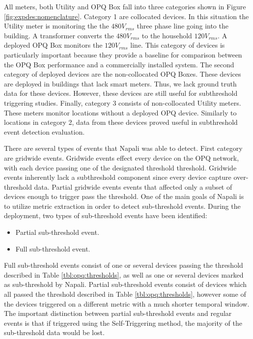 All meters, both Utility and OPQ Box fall into three categories shown in Figure \ref{fig:expdes:nomenclature}.
Category 1 are collocated devices.
In this situation the Utility meter is monitoring the the $480V_{rms}$ three phase line going into the building.
A transformer converts the $480V_{rms}$ to the household $120V_{rms}$.
A deployed OPQ Box monitors the $120V_{rms}$ line.
This category of devices is particularly important because they provide a baseline for comparison between the OPQ Box performance and a commercially installed system.
The second category of deployed devices are the non-collocated OPQ Boxes.
These devices are deployed in buildings that lack smart meters.
Thus, we lack ground truth data for these devices.
However, these devices are still useful for subthreshold triggering studies.
Finally, category 3 consists of non-collocated Utility meters.
These meters monitor locations without a deployed OPQ device.
Similarly to locations in category 2, data from these devices proved useful in subthreshold event detection evaluation.

There are several types of events that Napali was able to detect.
First category are gridwide events.
Gridwide events effect every device on the OPQ network, with each device passing one of the designated threshold threshold.
Gridwide events inherently lack a subthreshold component since every device capture over-threshold data.
Partial gridwide events events that affected only a subset of devices enough to trigger pass the threshold.
One of the main goals of Napali is to utilize metric extraction in order to detect sub-threshold events.
During the deployment, two types of sub-threshold events have been identified:
\begin{itemize}
    \item Partial sub-threshold event.
    \item Full sub-threshold event.
\end{itemize}
Full sub-threshold events consist of one or several devices passing the threshold described in Table \ref{tbl:opq:thresholds},
as well as one or several devices marked as sub-threshold by Napali.
Partial sub-threshold events consist of devices which all passed the threshold described in Table \ref{tbl:opq:thresholds}, however some of the devices triggered on a different metric with a much shorter temporal window.
The important distinction between partial sub-threshold events and regular events is that if triggered using the Self-Triggering method, the majority of the sub-threshold data would be lost.

